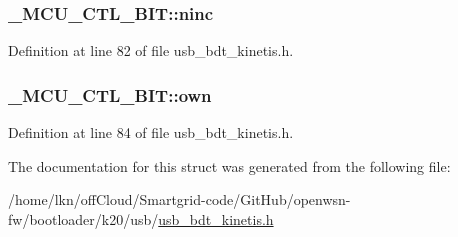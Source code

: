 \subsubsection[{\texorpdfstring{ninc}{ninc}}]{ \+\_\+\+M\+C\+U\+\_\+\+C\+T\+L\+\_\+\+B\+I\+T\+::ninc}\hypertarget{struct___m_c_u___c_t_l___b_i_t_ab3ac5cbc80ff22c5aecfa93984fc683b}{}\label{struct___m_c_u___c_t_l___b_i_t_ab3ac5cbc80ff22c5aecfa93984fc683b}


Definition at line 82 of file usb\+\_\+bdt\+\_\+kinetis.\+h.

\subsubsection[{\texorpdfstring{own}{own}}]{ \+\_\+\+M\+C\+U\+\_\+\+C\+T\+L\+\_\+\+B\+I\+T\+::own}\hypertarget{struct___m_c_u___c_t_l___b_i_t_a6c2ea9a559539c51000a7c130c3fbbc8}{}\label{struct___m_c_u___c_t_l___b_i_t_a6c2ea9a559539c51000a7c130c3fbbc8}


Definition at line 84 of file usb\+\_\+bdt\+\_\+kinetis.\+h.



The documentation for this struct was generated from the following file\+:\begin{DoxyCompactItemize}
\item 
/home/lkn/off\+Cloud/\+Smartgrid-\/code/\+Git\+Hub/openwsn-\/fw/bootloader/k20/usb/\hyperlink{usb__bdt__kinetis_8h}{usb\+\_\+bdt\+\_\+kinetis.\+h}\end{DoxyCompactItemize}
